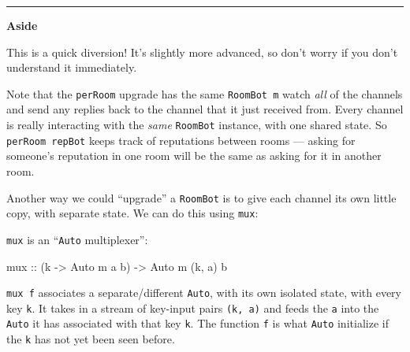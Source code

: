 \documentclass[]{article}
\newenvironment{Shaded}{}{}
\newcommand{\KeywordTok}[1]{\textcolor[rgb]{0.00,0.44,0.13}{\textbf{{#1}}}}
\newcommand{\DataTypeTok}[1]{\textcolor[rgb]{0.56,0.13,0.00}{{#1}}}
\newcommand{\CommentTok}[1]{\textcolor[rgb]{0.38,0.63,0.69}{\textit{{#1}}}}
\newcommand{\OtherTok}[1]{\textcolor[rgb]{0.00,0.44,0.13}{{#1}}}
\newcommand{\FunctionTok}[1]{\textcolor[rgb]{0.02,0.16,0.49}{{#1}}}
\newcommand{\NormalTok}[1]{{#1}}
\begin{document}
\begin{center}\rule{0.5\linewidth}{\linethickness}\end{center}

\textbf{Aside}

This is a quick diversion! It's slightly more advanced, so don't worry
if you don't understand it immediately.

Note that the \texttt{perRoom} upgrade has the same \texttt{RoomBot\ m}
watch \emph{all} of the channels and send any replies back to the
channel that it just received from. Every channel is really interacting
with the \emph{same} \texttt{RoomBot} instance, with one shared state.
So \texttt{perRoom\ repBot} keeps track of reputations between rooms ---
asking for someone's reputation in one room will be the same as asking
for it in another room.

Another way we could ``upgrade'' a \texttt{RoomBot} is to give each
channel its own little copy, with separate state. We can do this using
\texttt{mux}:

\begin{Shaded}
\end{Shaded}

\texttt{mux} is an ``\texttt{Auto} multiplexer'':

\begin{Shaded}
\begin{Highlighting}[]
\OtherTok{mux ::} \NormalTok{(k }\OtherTok{->} \DataTypeTok{Auto} \NormalTok{m a b) }\OtherTok{->} \DataTypeTok{Auto} \NormalTok{m (k, a) b}
\end{Highlighting}
\end{Shaded}

\texttt{mux\ f} associates a separate/different \texttt{Auto}, with its
own isolated state, with every key \texttt{k}. It takes in a stream of
key-input pairs \texttt{(k,\ a)} and feeds the \texttt{a} into the
\texttt{Auto} it has associated with that key \texttt{k}. The function
\texttt{f} is what \texttt{Auto} initialize if the \texttt{k} has not
yet been seen before.
\end{document}
